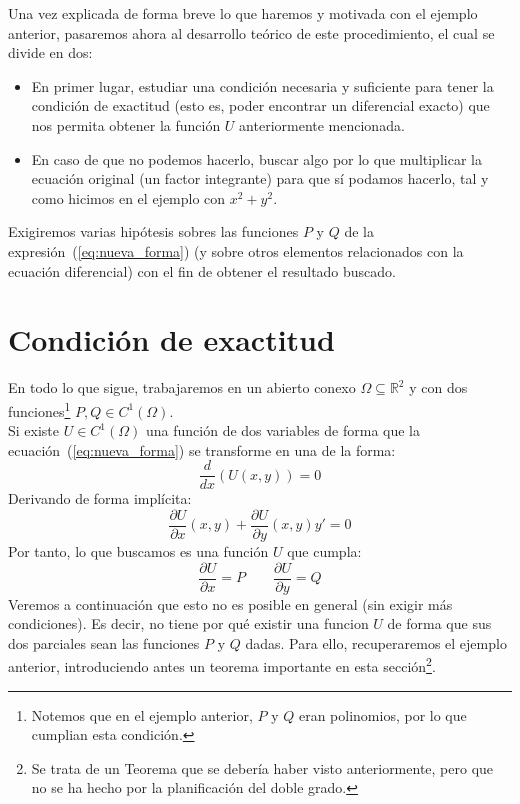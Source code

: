Una vez explicada de forma breve lo que haremos y motivada con el ejemplo anterior, pasaremos ahora al desarrollo teórico de este procedimiento, el cual se divide en dos:
\begin{itemize}
    \item En primer lugar, estudiar una condición necesaria y suficiente para tener la condición de exactitud (esto es, poder encontrar un diferencial exacto) que nos permita obtener la función $U$ anteriormente mencionada.
    \item En caso de que no podemos hacerlo, buscar algo por lo que multiplicar la ecuación original (un factor integrante) para que sí podamos hacerlo, tal y como hicimos en el ejemplo con $x^2+y^2$.
\end{itemize}
Exigiremos varias hipótesis sobres las funciones $P$ y $Q$ de la expresión~(\ref{eq:nueva_forma}) (y sobre otros elementos relacionados con la ecuación diferencial) con el fin de obtener el resultado buscado.

\section{Condición de exactitud}
En todo lo que sigue, trabajaremos en un abierto conexo $\Omega\subseteq \mathbb{R}^2$ y con dos funciones\footnote{Notemos que en el ejemplo anterior, $P$ y $Q$ eran polinomios, por lo que cumplian esta condición.} $P,Q\in C^1(\Omega)$.\\

Si existe $U\in C^1(\Omega)$ una función de dos variables de forma que la ecuación~(\ref{eq:nueva_forma}) se transforme en una de la forma:
\begin{equation*}
    \dfrac{d}{dx}(U(x,y)) = 0
\end{equation*}
Derivando de forma implícita:
\begin{equation*}
    \dfrac{\partial U}{\partial x}(x,y) + \dfrac{\partial U}{\partial y}(x,y)y' = 0
\end{equation*}
Por tanto, lo que buscamos es una función $U$ que cumpla:
\begin{equation*}
    \dfrac{\partial U}{\partial x} = P \qquad \dfrac{\partial U}{\partial y} = Q
\end{equation*}
Veremos a continuación que esto no es posible en general (sin exigir más condiciones). Es decir, no tiene por qué existir una funcion $U$ de forma que sus dos parciales sean las funciones $P$ y $Q$ dadas. Para ello, recuperaremos el ejemplo anterior, introduciendo antes un teorema importante en esta sección\footnote{Se trata de un Teorema que se debería haber visto anteriormente, pero que no se ha hecho por la planificación del doble grado.}.

